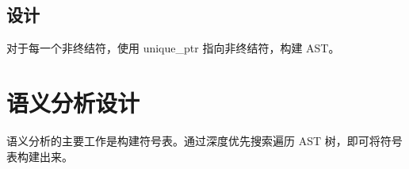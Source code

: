 \documentclass[a4paper]{article}
\begin{document}
		\subsection{设计}
		
			对于每一个非终结符，使用 unique\_ptr 指向非终结符，构建 AST。
			
	\section{语义分析设计}
	
		语义分析的主要工作是构建符号表。通过深度优先搜索遍历 AST 树，即可将符号表构建出来。

	
	
	
	
	
	
\end{document}

